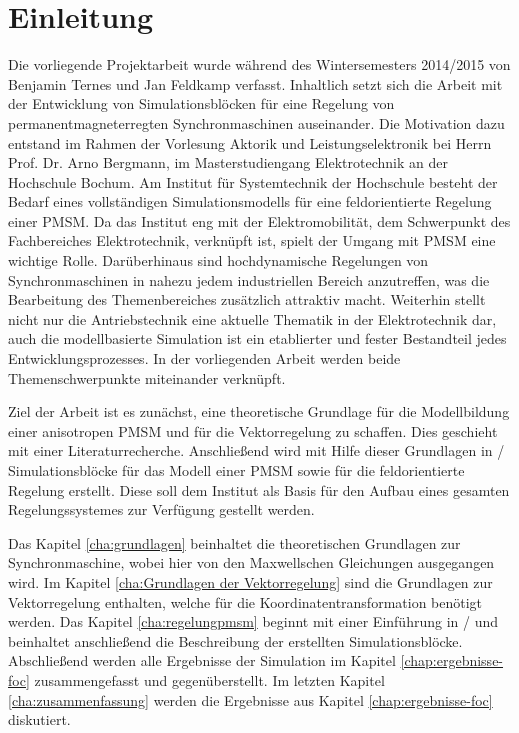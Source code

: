 
\chapter*{Einleitung}
\label{cha:einleitung}

Die vorliegende Projektarbeit wurde während des Wintersemesters 2014/2015 von Benjamin Ternes und Jan Feldkamp verfasst.
Inhaltlich setzt sich die Arbeit mit der Entwicklung von Simulationsblöcken für eine Regelung von permanentmagneterregten Synchronmaschinen auseinander.
Die Motivation dazu entstand im Rahmen der Vorlesung \glqq Aktorik und Leistungselektronik\grqq{} bei Herrn Prof. Dr. Arno Bergmann, im Masterstudiengang Elektrotechnik an der Hochschule Bochum.
Am Institut für Systemtechnik der Hochschule besteht der Bedarf eines vollständigen Simulationsmodells für eine feldorientierte Regelung einer PMSM.
Da das Institut eng mit der Elektromobilität, dem Schwerpunkt des Fachbereiches Elektrotechnik, verknüpft ist, spielt der Umgang mit PMSM eine wichtige Rolle.
Darüberhinaus sind hochdynamische Regelungen von Synchronmaschinen in nahezu jedem industriellen Bereich anzutreffen, was die Bearbeitung des Themenbereiches zusätzlich attraktiv macht.
Weiterhin stellt nicht nur die Antriebstechnik eine aktuelle Thematik in der Elektrotechnik dar, auch die modellbasierte Simulation ist ein etablierter und fester Bestandteil jedes Entwicklungsprozesses.
In der vorliegenden Arbeit werden beide Themenschwerpunkte miteinander verknüpft.

Ziel der Arbeit ist es zunächst, eine theoretische Grundlage für die Modellbildung einer anisotropen PMSM und für die Vektorregelung zu schaffen.
Dies geschieht mit einer Literaturrecherche.
Anschließend wird mit Hilfe dieser Grundlagen in / Simulationsblöcke für das Modell einer PMSM sowie für die feldorientierte Regelung erstellt.
Diese soll dem Institut als Basis für den Aufbau eines gesamten Regelungssystemes zur Verfügung gestellt werden.

Das Kapitel \ref{cha:grundlagen} beinhaltet die theoretischen Grundlagen zur Synchronmaschine, wobei hier von den Maxwellschen Gleichungen ausgegangen wird.
Im Kapitel \ref{cha:Grundlagen der Vektorregelung} sind die Grundlagen zur Vektorregelung enthalten, welche für die Koordinatentransformation benötigt werden.
Das Kapitel \ref{cha:regelungpmsm} beginnt mit einer Einführung in / und beinhaltet anschließend die Beschreibung der erstellten Simulationsblöcke.
Abschließend werden alle Ergebnisse der Simulation im Kapitel \ref{chap:ergebnisse-foc} zusammengefasst und gegenüberstellt.
Im letzten Kapitel \ref{cha:zusammenfassung} werden die Ergebnisse aus Kapitel \ref{chap:ergebnisse-foc} diskutiert.


 

\cleardoublepage
